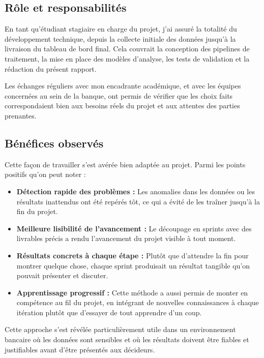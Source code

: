 \documentclass[11pt,a4paper,twoside]{report}
\begin{document}
\subsection{Rôle et responsabilités}

En tant qu'étudiant stagiaire en charge du projet, j'ai assuré la totalité du
développement technique, depuis la collecte initiale des données jusqu'à la
livraison du tableau de bord final. Cela couvrait la conception des pipelines
de traitement, la mise en place des modèles d'analyse, les tests de validation
et la rédaction du présent rapport.

Les échanges réguliers avec mon encadrante académique,
et avec les équipes concernées au sein de la banque, ont permis de vérifier que
les choix faits correspondaient bien aux besoins réels du projet et aux attentes
des parties prenantes.

\subsection{Bénéfices observés}

Cette façon de travailler s'est avérée bien adaptée au projet. Parmi les points
positifs qu'on peut noter :

\begin{itemize}[leftmargin=1.2cm]
    \item \textbf{Détection rapide des problèmes :} Les anomalies dans les données ou les
    résultats inattendus ont été repérés tôt, ce qui a évité de les traîner jusqu'à la
    fin du projet.
    \item \textbf{Meilleure lisibilité de l'avancement :} Le découpage en sprints avec des
    livrables précis a rendu l'avancement du projet visible à tout moment.
    \item \textbf{Résultats concrets à chaque étape :} Plutôt que d'attendre la fin pour
    montrer quelque chose, chaque sprint produisait un résultat tangible qu'on pouvait
    présenter et discuter.
    \item \textbf{Apprentissage progressif :} Cette méthode a aussi permis de monter en
    compétence au fil du projet, en intégrant de nouvelles connaissances à chaque itération
    plutôt que d'essayer de tout apprendre d'un coup.
\end{itemize}

Cette approche s'est révélée particulièrement utile dans un environnement bancaire où
les données sont sensibles et où les résultats doivent être fiables et justifiables
avant d'être présentés aux décideurs.
\end{document}
